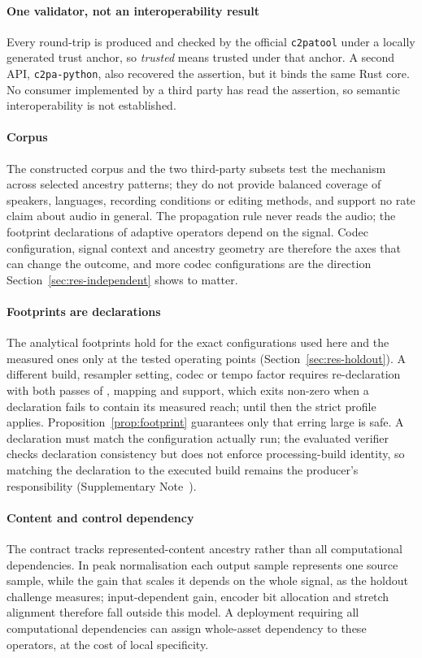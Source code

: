 \documentclass[preprint,3p,11pt,authoryear]{elsarticle}
\begin{document}
\paragraph{One validator, not an interoperability result} Every round-trip is
produced and checked by the official \texttt{c2patool} under a locally generated
trust anchor, so \emph{trusted} means trusted under that anchor. A second API,
\texttt{c2pa-python}, also recovered the assertion, but it binds the same Rust
core. No consumer implemented by a third party has read the assertion, so semantic
interoperability is not established.

\paragraph{Corpus} The constructed corpus and the two third-party subsets test
the mechanism across selected ancestry patterns; they do not provide balanced
coverage of speakers, languages, recording conditions or editing methods, and
support no rate claim about audio in general. The propagation rule never reads the
audio; the footprint declarations of adaptive operators depend on the signal.
Codec configuration, signal context and ancestry geometry are therefore the
axes that can change the outcome, and more codec configurations are the
direction Section~\ref{sec:res-independent} shows to matter.

\paragraph{Footprints are declarations} The analytical footprints hold for the
exact configurations used here and the measured ones only at the tested operating
points (Section~\ref{sec:res-holdout}). A different build, resampler setting, codec
or tempo factor requires re-declaration with both passes of
, mapping and support, which exits non-zero
when a declaration fails to contain its measured reach; until then the strict
profile applies. Proposition~\ref{prop:footprint} guarantees only that erring large
is safe. A declaration must match the configuration actually run; the evaluated
verifier checks declaration consistency but does not enforce processing-build
identity, so matching the declaration to the executed build remains the
producer's responsibility (Supplementary Note~\NoteSchema{}).

\paragraph{Content and control dependency} The contract tracks
represented-content ancestry rather than all computational dependencies. In peak
normalisation each output sample represents one source sample, while the gain
that scales it depends on the whole signal, as the holdout challenge measures;
input-dependent gain, encoder bit allocation and stretch alignment therefore fall
outside this model. A deployment requiring all computational dependencies can
assign whole-asset dependency to these operators, at the cost of local
specificity.
\end{document}
